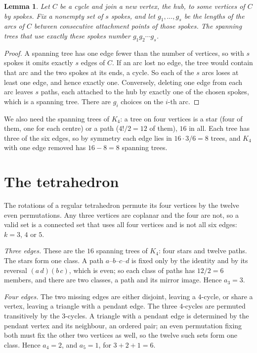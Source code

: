 \documentclass[11pt]{amsart}
\newtheorem{lemma}[theorem]{Lemma}
\theoremstyle{remark}
\begin{document}
\begin{lemma}\label{lem:hub}
Let $C$ be a cycle and join a new vertex, the hub, to some vertices of $C$ by spokes. Fix a nonempty set of $s$ spokes, and let $g_1,\dots,g_s$ be the lengths of the arcs of $C$ between consecutive attachment points of those spokes. The spanning trees that use exactly these spokes number $g_1g_2\cdots g_s$.
\end{lemma}

\begin{proof}
A spanning tree has one edge fewer than the number of vertices, so with $s$ spokes it omits exactly $s$ edges of $C$. If an arc lost no edge, the tree would contain that arc and the two spokes at its ends, a cycle. So each of the $s$ arcs loses at least one edge, and hence exactly one. Conversely, deleting one edge from each arc leaves $s$ paths, each attached to the hub by exactly one of the chosen spokes, which is a spanning tree. There are $g_i$ choices on the $i$-th arc.
\end{proof}

We also need the spanning trees of $K_4$: a tree on four vertices is a star (four of them, one for each centre) or a path ($4!/2=12$ of them), $16$ in all. Each tree has three of the six edges, so by symmetry each edge lies in $16\cdot3/6=8$ trees, and $K_4$ with one edge removed has $16-8=8$ spanning trees.

\section{The tetrahedron}

The rotations of a regular tetrahedron permute its four vertices by the twelve even permutations. Any three vertices are coplanar and the four are not, so a valid set is a connected set that uses all four vertices and is not all six edges: $k=3$, $4$ or $5$.

\emph{Three edges.} These are the $16$ spanning trees of $K_4$: four stars and twelve paths. The stars form one class. A path $a$--$b$--$c$--$d$ is fixed only by the identity and by its reversal $(a\,d)(b\,c)$, which is even; so each class of paths has $12/2=6$ members, and there are two classes, a path and its mirror image. Hence $a_3=3$.

\emph{Four edges.} The two missing edges are either disjoint, leaving a $4$-cycle, or share a vertex, leaving a triangle with a pendant edge. The three $4$-cycles are permuted transitively by the $3$-cycles. A triangle with a pendant edge is determined by the pendant vertex and its neighbour, an ordered pair; an even permutation fixing both must fix the other two vertices as well, so the twelve such sets form one class. Hence $a_4=2$, and $a_5=1$, for $3+2+1=6$.
\end{document}
